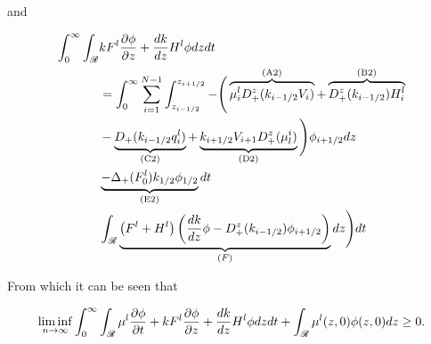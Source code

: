 {{\begin{proposition}
	and 
	
	\begin{align}
		\int_0^{\infty} \int_{\mathscr{R}}  &k F^l \frac{\partial \phi}{\partial z}  + \frac{ d k}{dz}H^l\phi dz dt \label{prop:int_man_3:LHS2} \\
		&= \int_0^\infty \sum_{i=1}^{N-1} \int_{z_{i-1/2}}^{z_{i+1/2}} - \Bigg( \overbrace{\mu_i^l D_+^z(k_{i-1/2}V_i)}^\text{(A2)} + \overbrace{ D_+^z(k_{i-1/2})H_i^l}^\text{(B2)} \label{prop:int_man_3:RHS2_AB}\\&-  \underbrace{D_+(k_{i-1/2} q_i^l)}_\text{(C2)} + \underbrace{k_{i+1/2} V_{i+1} D_+^z(\mu_l^i)}_\text{(D2)}  \Bigg) \phi_{i+1/2} dz \label{prop:int_man_3:RHS2_CD}\\
		\quad \quad &  \underbrace{-\Delta_+(F^l_0)k_{1/2}\phi_{1/2}}_\text{(E2)}  \label{prop:int_man_3:RHS2_E}dt \\
		&\int_{\mathscr{R}} \underbrace{\left(F^l +  H^l\right)\left(\frac{dk}{dz} \phi  - D_+^z(k_{i-1/2}) \phi_{i+1/2}\right)}_{(F)} dz \Bigg)dt\label{prop:int_man_3:RHS2_F}
	\end{align}

	From which it can be seen that  
	
	\begin{align} \label{prop:int_man_3:liminf}
		\liminf_{n \rightarrow \infty}\int_0^{\infty} \int_{\mathscr{R}}  \mu^l \frac{\partial \phi}{\partial t} +k F^l \frac{\partial \phi}{\partial z}  + \frac{ d k}{dz}H^l \phi  dz dt + \int_{\mathscr{R}} \mu^l(z,0) \phi(z,0) dz\geq 0.
	\end{align}
\end{proposition}

}}
